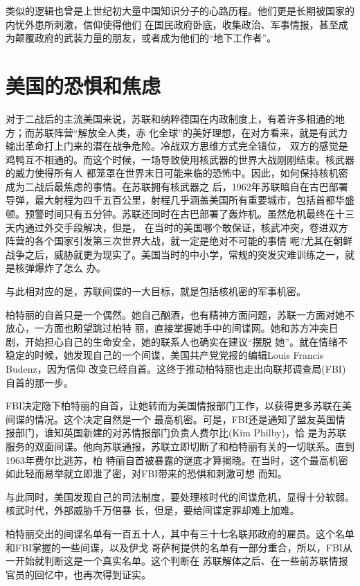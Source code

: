 \documentclass[10pt]{article}
\begin{document}
{类似的逻辑也曾是上世纪初大量中国知识分子的心路历程。他们更是长期被国家的内忧外患所刺激，信仰使得他们
在国民政府卧底，收集政治、军事情报，甚至成为颠覆政府的武装力量的朋友，或者成为他们的``地下工作者''。

\pagebreak
\section{美国的恐惧和焦虑}

对于二战后的主流美国来说，苏联和纳粹德国在内政制度上，有着许多相通的地方；而苏联阵营``解放全人类，赤
化全球''的美好理想，在对方看来，就是有武力输出革命打上门来的潜在战争危险。冷战双方思维方式完全错位，
双方的感觉是鸡鸭互不相通的。而这个时候，一场导致使用核武器的世界大战刚刚结束。核武器的威力使得所有人
都笼罩在世界末日可能来临的恐怖中。因此，如何保持核机密成为二战后最焦虑的事情。在苏联拥有核武器之
后，1962年苏联暗自在古巴部署导弹，最大射程为四千五百公里，射程几乎涵盖美国所有重要城市，包括首都华盛
顿。预警时间只有五分钟。苏联还同时在古巴部署了轰炸机。虽然危机最终在十三天内通过外交手段解决，但是，
在当时的美国哪个敢保证，核武冲突，卷进双方阵营的各个国家引发第三次世界大战，就一定是绝对不可能的事情
呢?尤其在朝鲜战争之后，威胁就更为现实了。美国当时的中小学，常规的突发灾难训练之一，就是核弹爆炸了怎么
办。

与此相对应的是，苏联间谍的一大目标，就是包括核机密的军事机密。

柏特丽的自首只是一个偶然。她自己酗酒，也有精神方面问题，苏联一方面对她不放心，一方面也盼望跳过柏特
丽，直接掌握她手中的间谍网。她和苏方冲突日剧，开始担心自己的生命安全，她的联系人也确实在建议``摆脱
她''。就在情绪不稳定的时候，她发现自己的一个间谍，美国共产党党报的编辑Louis Francis Budenz，因为信仰
改变已经自首。这终于推动柏特丽也走出向联邦调查局(FBI)自首的那一步。

FBI决定隐下柏特丽的自首，让她转而为美国情报部门工作，以获得更多苏联在美间谍的情况。这个决定自然是一个
最高机密。可是，FBI还是通知了盟友英国情报部门，谁知英国新建的对苏情报部门负责人费尔比(Kim Philby)，恰
是为苏联服务的双面间谍。他向苏联通报，苏联立即切断了和柏特丽有关的一切联系。直到1963年费尔比逃苏，柏
特丽自首被暴露的谜底才算揭晓。在当时，这个最高机密如此轻而易举就立即泄了密，对FBI带来的恐惧和刺激可想
而知。

与此同时，美国发现自己的司法制度，要处理核时代的间谍危机，显得十分软弱。核武时代，外部威胁千万倍暴
长，但是，要给间谍定罪却难上加难。

柏特丽交出的间谍名单有一百五十人，其中有三十七名联邦政府的雇员。这个名单和FBI掌握的一些间谍，以及伊戈
\textperiodcentered 哥萨柯提供的名单有一部分重合，所以，FBI从一开始就判断这是一个真实名单。这个判断在
苏联解体之后、在一些前苏联情报官员的回忆中，也再次得到证实。

}
\end{document}
